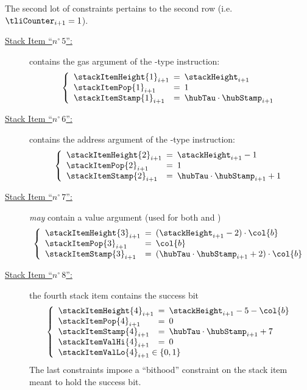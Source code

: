 The second lot of constraints pertains to the second row (i.e. $\tliCounter_{i + 1} = 1$).
\begin{description}
	\item[\underline{Stack Item ``$n^\circ\,5$'':}] contains the gas argument of the -type instruction:
	\[
	\left\{
	\begin{array}{lcl}
		\stackItemHeight{1}_{i + 1}	& \!\!\! = \!\!\! & \stackHeight_{i + 1}  \\
		\stackItemPop{1}_{i + 1}	& \!\!\! = \!\!\! & 1 \\
		\stackItemStamp{1}_{i + 1}	& \!\!\! = \!\!\! & \hubTau \cdot \hubStamp_{i + 1} \\
	\end{array}
	\right.
	\]
	\item[\underline{Stack Item ``$n^\circ\,6$'':}] contains the address argument of the -type instruction:
	\[
	\left\{
	\begin{array}{lcl}
		\stackItemHeight{2}_{i + 1}	& \!\!\! = \!\!\! & \stackHeight_{i + 1} - 1 \\
		\stackItemPop{2}_{i + 1}	& \!\!\! = \!\!\! & 1 \\
		\stackItemStamp{2}_{i + 1}	& \!\!\! = \!\!\! & \hubTau \cdot \hubStamp_{i + 1} + 1 \\
	\end{array}
	\right.
	\]
	\item[\underline{Stack Item ``$n^\circ\,7$'':}] \emph{may} contain a value argument (used for both  and )
	\[
	\left\{
	\begin{array}{lcl}
		\stackItemHeight{3}_{i + 1}	& \!\!\! = \!\!\! & (\stackHeight_{i + 1} - 2) \cdot \col{b} \\
		\stackItemPop{3}_{i + 1}	& \!\!\! = \!\!\! & \col{b} \\
		\stackItemStamp{3}_{i + 1}	& \!\!\! = \!\!\! & (\hubTau \cdot \hubStamp_{i + 1} + 2)\cdot \col{b} \\
	\end{array}
	\right.
	\]
	\item[\underline{Stack Item ``$n^\circ\,8$'':}] the fourth stack item contains the success bit
	\[
	\left\{
	\begin{array}{lcl}
		\stackItemHeight{4}_{i + 1}	& \!\!\! = \!\!\! & \stackHeight_{i + 1} - 5 - \col{b} \\
		\stackItemPop{4}_{i + 1}	& \!\!\! = \!\!\! & 0 \\
		\stackItemStamp{4}_{i + 1}	& \!\!\! = \!\!\! & \hubTau \cdot \hubStamp_{i + 1} + 7 \\
		\stackItemValHi{4}_{i + 1}	& \!\!\! = \!\!\! & 0 \\
		\multicolumn{3}{l}{\stackItemValLo{4}_{i + 1} \in \{ 0, 1 \} } \\
	\end{array}
	\right.
	\]
	\saNote{} The last constraints impose a ``bithood'' constraint on the stack item meant to hold the success bit.
\end{description}
